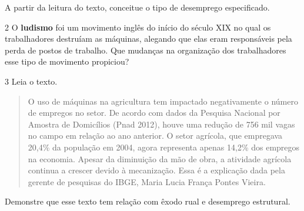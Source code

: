 A partir da leitura do texto, conceitue o tipo de desemprego
especificado.


\num{2} O \textbf{ludismo} foi um movimento inglês do início do século
XIX no qual os trabalhadores destruíam as máquinas, alegando que elas
eram responsáveis pela perda de postos de trabalho. Que mudanças na
organização dos trabalhadores esse tipo de movimento propiciou?


\num{3} Leia o texto.

\begin{quote}
O uso de máquinas na agricultura tem impactado negativamente o número de
empregos no setor. De acordo com dados da Pesquisa Nacional por Amostra
de Domicílios (Pnad 2012), houve uma redução de 756 mil vagas no campo
em relação ao ano anterior. O setor agrícola, que empregava 20,4\% da
população em 2004, agora representa apenas 14,2\% dos empregos na
economia. Apesar da diminuição da mão de obra, a atividade agrícola
continua a crescer devido à mecanização. Essa é a explicação dada pela
gerente de pesquisas do IBGE, Maria Lucia França Pontes Vieira.

\end{quote}

Demonstre que esse texto tem relação com êxodo rual e desemprego
estrutural.

